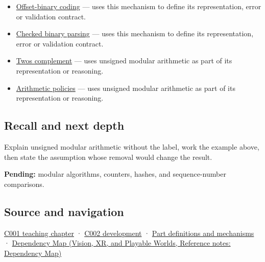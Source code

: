 \begin{itemize}
\item
  \hyperref[appendix-53a8cfb25f8d]{Offset-binary coding} --- uses this mechanism to define its representation, error or validation contract.
\item
  \hyperref[appendix-652d81568de9]{Checked binary parsing} --- uses this mechanism to define its representation, error or validation contract.
\item
  \hyperref[appendix-4fbc03d20829]{Two\textquotesingle s complement} --- uses unsigned modular arithmetic as part of its representation or reasoning.
\item
  \hyperref[appendix-2ed044358b82]{Arithmetic policies} --- uses unsigned modular arithmetic as part of its representation or reasoning.
\end{itemize}

\subsection{Recall and next depth}\label{appendix-c99977d88b33-recall-and-next-depth}

Explain unsigned modular arithmetic without the label, work the example above, then state the assumption whose removal would change the result.

\textbf{Pending:} modular algorithms, counters, hashes, and sequence-number comparisons.

\subsection{Source and navigation}\label{appendix-c99977d88b33-source-and-navigation}

\hyperref[01-foundations-i-ch001-from-a-signal-to-an-interpretation]{C001 teaching chapter} · \hyperref[01-foundations-i-ch001-arithmetic-becomes-a-policy]{C002 development} · \hyperref[appendix-fd090d982a15]{Part definitions and mechanisms} · \href{../07-Vision-XR-and-Playable-Worlds/main.pdf\#nameddest=appendix-4ad47bdd269a}{Dependency Map (Vision, XR, and Playable Worlds, Reference notes: Dependency Map)}
